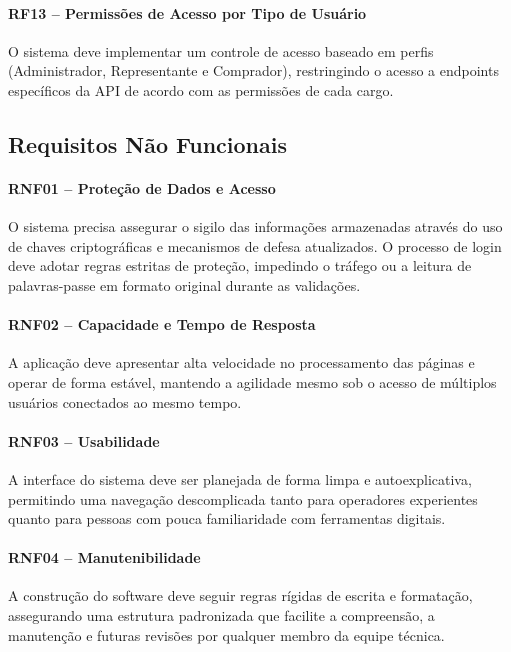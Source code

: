 \documentclass[12pt,a4paper]{article}
\begin{document}
\paragraph*{RF13 -- Permissões de Acesso por Tipo de Usuário}
O sistema deve implementar um controle de acesso baseado em perfis (Administrador, Representante e Comprador), restringindo o acesso a endpoints específicos da API de acordo com as permissões de cada cargo.

\subsection{Requisitos Não Funcionais}

\paragraph*{RNF01 -- Proteção de Dados e Acesso}
O sistema precisa assegurar o sigilo das informações armazenadas através do uso de chaves criptográficas e mecanismos de defesa atualizados. O processo de login deve adotar regras estritas de proteção, impedindo o tráfego ou a leitura de palavras-passe em formato original durante as validações.

\paragraph*{RNF02 -- Capacidade e Tempo de Resposta}
A aplicação deve apresentar alta velocidade no processamento das páginas e operar de forma estável, mantendo a agilidade mesmo sob o acesso de múltiplos usuários conectados ao mesmo tempo.

\paragraph*{RNF03 -- Usabilidade}
A interface do sistema deve ser planejada de forma limpa e autoexplicativa, permitindo uma navegação descomplicada tanto para operadores experientes quanto para pessoas com pouca familiaridade com ferramentas digitais.

\paragraph*{RNF04 -- Manutenibilidade}
A construção do software deve seguir regras rígidas de escrita e formatação, assegurando uma estrutura padronizada que facilite a compreensão, a manutenção e futuras revisões por qualquer membro da equipe técnica.
\end{document}
